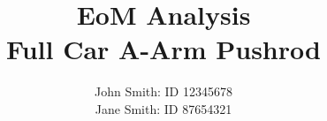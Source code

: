 \title{
EoM Analysis
\\
 Full Car A-Arm Pushrod 
\\
}
\author{
John Smith: ID 12345678
\\
Jane Smith: ID 87654321
\\
}
